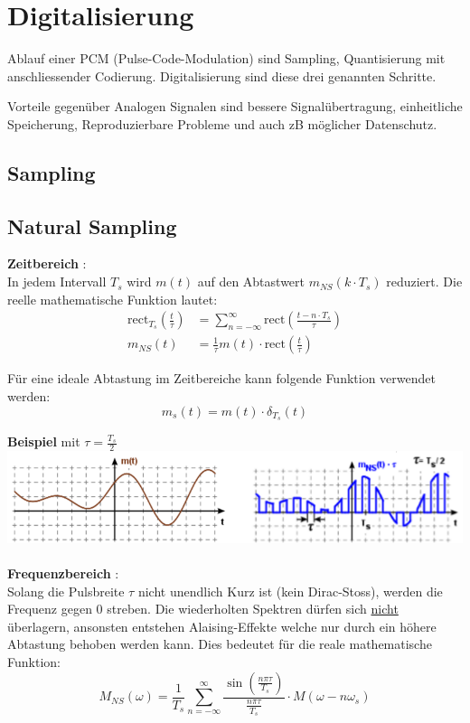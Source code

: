 \section{Digitalisierung}
Ablauf einer PCM (Pulse-Code-Modulation) sind Sampling, Quantisierung mit anschliessender Codierung. Digitalisierung sind diese drei genannten Schritte.

Vorteile gegenüber Analogen Signalen sind bessere Signalübertragung, einheitliche Speicherung, Reproduzierbare Probleme und auch zB möglicher Datenschutz.

\subsection{Sampling}
\subsection{Natural Sampling}
\textbf{Zeitbereich} :\\
In jedem Intervall $T_s$ wird $m(t)$ auf den Abtastwert $m_{NS}(k\cdot T_s)$ reduziert. Die reelle mathematische Funktion lautet:
\begin{align*}
	\text{rect}_{T_s}\left(\frac{t}{\tau}\right) &= \sum_{n=-\infty}^{\infty}\text{rect}\left(\frac{t - n\cdot T_s}{\tau}\right) \\
	m_{NS}(t) &= \frac{1}{\tau}m(t)\cdot\text{rect}\left(\frac{t}{\tau}\right)
\end{align*}

Für eine ideale Abtastung im Zeitbereiche kann folgende Funktion verwendet werden:
\[
m_s(t) = m(t)\cdot \delta_{T_s}(t)
\]

\textbf{Beispiel} mit $\tau = \frac{T_s}{2}$\\
\includegraphics[width=\columnwidth]{Images/natural_time}
~\\
\textbf{Frequenzbereich} :\\
Solang die Pulsbreite $\tau$ nicht unendlich Kurz ist (kein Dirac-Stoss), werden die Frequenz gegen 0 streben. Die wiederholten Spektren dürfen sich \underline{nicht} überlagern, ansonsten entstehen Alaising-Effekte welche nur durch ein höhere Abtastung behoben werden kann. Dies bedeutet für die reale mathematische Funktion:
\[
M_{NS}(\omega) = \frac{1}{T_s}\sum_{n=-\infty}^{\infty}\frac{\sin\left(\frac{n\pi\tau}{T_s}\right)}{\frac{n\pi\tau}{T_s}}\cdot M(\omega - n \omega_s)
\]

